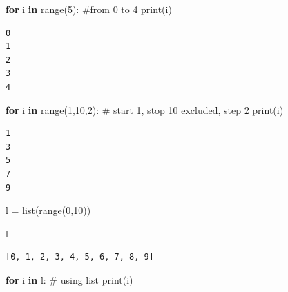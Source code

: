 \documentclass[
  letterpaper,
  DIV=11,
  numbers=noendperiod]{scrreprt}
\newenvironment{Shaded}{\begin{snugshade}}{\end{snugshade}}
\newcommand{\BuiltInTok}[1]{\textcolor[rgb]{0.00,0.23,0.31}{#1}}
\newcommand{\CommentTok}[1]{\textcolor[rgb]{0.37,0.37,0.37}{#1}}
\newcommand{\ControlFlowTok}[1]{\textcolor[rgb]{0.00,0.23,0.31}{\textbf{#1}}}
\newcommand{\DecValTok}[1]{\textcolor[rgb]{0.68,0.00,0.00}{#1}}
\newcommand{\KeywordTok}[1]{\textcolor[rgb]{0.00,0.23,0.31}{\textbf{#1}}}
\newcommand{\NormalTok}[1]{\textcolor[rgb]{0.00,0.23,0.31}{#1}}
\newcommand{\OperatorTok}[1]{\textcolor[rgb]{0.37,0.37,0.37}{#1}}
\begin{document}

\begin{Shaded}
\begin{Highlighting}[]
\ControlFlowTok{for}\NormalTok{ i }\KeywordTok{in} \BuiltInTok{range}\NormalTok{(}\DecValTok{5}\NormalTok{): }\CommentTok{\#from 0 to 4 }
    \BuiltInTok{print}\NormalTok{(i)}
\end{Highlighting}
\end{Shaded}

\begin{verbatim}
0
1
2
3
4
\end{verbatim}

\begin{Shaded}
\begin{Highlighting}[]
\ControlFlowTok{for}\NormalTok{ i }\KeywordTok{in} \BuiltInTok{range}\NormalTok{(}\DecValTok{1}\NormalTok{,}\DecValTok{10}\NormalTok{,}\DecValTok{2}\NormalTok{): }\CommentTok{\# start 1, stop 10 excluded, step 2}
    \BuiltInTok{print}\NormalTok{(i)}
\end{Highlighting}
\end{Shaded}

\begin{verbatim}
1
3
5
7
9
\end{verbatim}

\begin{Shaded}
\begin{Highlighting}[]
\NormalTok{l }\OperatorTok{=} \BuiltInTok{list}\NormalTok{(}\BuiltInTok{range}\NormalTok{(}\DecValTok{0}\NormalTok{,}\DecValTok{10}\NormalTok{))}
\end{Highlighting}
\end{Shaded}

\begin{Shaded}
\begin{Highlighting}[]
\NormalTok{l}
\end{Highlighting}
\end{Shaded}

\begin{verbatim}
[0, 1, 2, 3, 4, 5, 6, 7, 8, 9]
\end{verbatim}

\begin{Shaded}
\begin{Highlighting}[]
\ControlFlowTok{for}\NormalTok{ i }\KeywordTok{in}\NormalTok{ l:  }\CommentTok{\# using list}
    \BuiltInTok{print}\NormalTok{(i)}
\end{Highlighting}
\end{Shaded}
\end{document}
